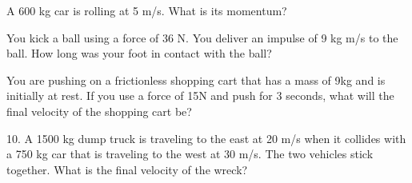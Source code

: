 \documentclass[10pt]{examdesign}
\begin{document}
\begin{multiplechoice} [title={Multiple Choice},
	rearrange=no]
	\begin{question}
		A 600 kg car is rolling at 5 m/s.  What is its momentum?
	\end{question}


	\begin{question}
You kick a ball using a force of 36 N.  You deliver an impulse of 9 kg m/s to the ball.  How long was your foot in contact with the ball?
	\choice{0.2 s}
	\choice[!]{0.25 s}
	\choice{0.4s}
	\choice{4 s}
\end{question}

	\begin{question}
You are pushing on a frictionless shopping cart that has a mass of 9kg and is initially at rest.  If you use a force of 15N and push for 3 seconds, what will the final velocity of the shopping cart be?
\end{question}


	\begin{question}
	10. A 1500 kg dump truck is traveling to the east at 20 m/s when it collides with a 750 kg car that is traveling to the west at 30 m/s.  The two vehicles stick together.  What is the final velocity of the wreck?
\end{question}

	

	\end{multiplechoice}
\end{document}
